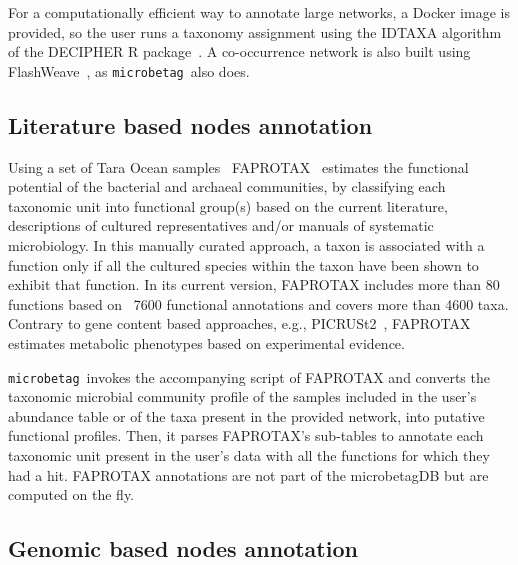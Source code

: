 \documentclass[sn-mathphys,Numbered]{sn-jnl}  %
\theoremstyle{thmstyleone}%
\theoremstyle{thmstyletwo}%
\theoremstyle{thmstylethree}%
\newcommand{\microbetag}{\texttt{microbetag}}
\begin{document}
        For a computationally efficient way to annotate large networks, a Docker image is provided, so the user runs a taxonomy assignment using the IDTAXA algorithm~\cite{murali2018idtaxa} of the DECIPHER R package~\cite{wright2016using}.
        A co-occurrence network is also built using FlashWeave~\cite{flashweave_cite}, as \microbetag~also does.


    \subsection*{Literature based nodes annotation}
    \label{subsec:fapro}

        Using a set of Tara Ocean samples~\cite{sunagawa2015structure} FAPROTAX~\cite{louca2016decoupling} estimates the functional potential of the bacterial and archaeal communities, by classifying each taxonomic unit into functional group(s) based on the current literature, descriptions of cultured representatives and/or manuals of systematic microbiology. 
        In this manually curated approach, a taxon is associated with a function only if all the cultured species within the taxon have been shown to exhibit that function. 
        In its current version, FAPROTAX includes more than 80 functions based on ~7600 functional annotations and covers more than 4600 taxa.
        Contrary to gene content based approaches, e.g., PICRUSt2~\cite{douglas2020picrust2}, FAPROTAX  estimates metabolic phenotypes based on experimental evidence. 

        \microbetag~invokes the accompanying script of FAPROTAX and converts the taxonomic microbial community profile of the samples included in the user's abundance table or of the taxa present in the provided network, into putative functional profiles.
        Then, it parses FAPROTAX's sub-tables to annotate each taxonomic unit present in the user's data with all the functions for which they had a hit. 
        FAPROTAX annotations are not part of the microbetagDB but are computed on the fly.


    \subsection*{Genomic based nodes annotation}
    \label{subsec:phen}
\end{document}
